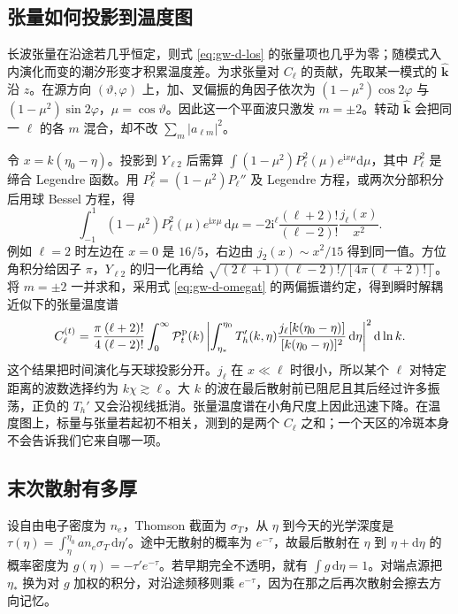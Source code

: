 \subsection{张量如何投影到温度图}

长波张量在沿途若几乎恒定，则式 \eqref{eq:gw-d-los} 的张量项也几乎为零；随模式入内演化而变的潮汐形变才积累温度差。为求张量对 $C_\ell$ 的贡献，先取某一模式的 $\hat{\bm k}$ 沿 $z$。在源方向 $(\vartheta,\varphi)$ 上，加、叉偏振的角因子依次为 $(1-\mu^2)\cos2\varphi$ 与 $(1-\mu^2)\sin2\varphi$，$\mu=\cos\vartheta$。因此这一个平面波只激发 $m=\pm2$。转动 $\hat{\bm k}$ 会把同一 $\ell$ 的各 $m$ 混合，却不改 $\sum_m|a_{\ell m}|^2$。

令 $x=k(\eta_0-\eta)$。投影到 $Y_{\ell 2}$ 后需算 $\int(1-\mu^2)P_\ell^2(\mu)e^{\mathrm i x\mu}\mathrm d\mu$，其中 $P_\ell^2$ 是缔合 Legendre 函数。用 $P_\ell^2=(1-\mu^2)P_\ell''$ 及 Legendre 方程，或两次分部积分后用球 Bessel 方程，得
\[
 \int_{-1}^1(1-\mu^2)P_\ell^2(\mu)e^{\mathrm i x\mu}\,\mathrm d\mu
 =-2\mathrm i^\ell\frac{(\ell+2)!}{(\ell-2)!}\frac{j_\ell(x)}{x^2}.
\]
例如 $\ell=2$ 时左边在 $x=0$ 是 $16/5$，右边由 $j_2(x)\sim x^2/15$ 得到同一值。方位角积分给因子 $\pi$，$Y_{\ell2}$ 的归一化再给 $\sqrt{(2\ell+1)(\ell-2)!/[4\pi(\ell+2)!]}$。将 $m=\pm2$ 一并求和，采用式 \eqref{eq:gw-d-omegat} 的两偏振谱约定，得到瞬时解耦近似下的张量温度谱
\begin{equation}\label{eq:gw-d-clt}
 C_\ell^{(t)}=\frac{\pi}{4}\frac{(\ell+2)!}{(\ell-2)!}
 \int_0^\infty \mathcal P_t^{\rm p}(k)
 \left|\int_{\eta_*}^{\eta_0}T_h'(k,\eta)
 \frac{j_\ell[k(\eta_0-\eta)]}{[k(\eta_0-\eta)]^2}\,\mathrm d\eta\right|^2\mathrm d\ln k .
\end{equation}
这个结果把时间演化与天球投影分开。$j_\ell$ 在 $x\ll\ell$ 时很小，所以某个 $\ell$ 对特定距离的波数选择约为 $k\chi\gtrsim\ell$。大 $k$ 的波在最后散射前已阻尼且其后经过许多振荡，正负的 $T_h'$ 又会沿视线抵消。张量温度谱在小角尺度上因此迅速下降。在温度图上，标量与张量若起初不相关，测到的是两个 $C_\ell$ 之和；一个天区的冷斑本身不会告诉我们它来自哪一项。

\subsection{末次散射有多厚}

设自由电子密度为 $n_e$，Thomson 截面为 $\sigma_T$，从 $\eta$ 到今天的光学深度是 $\tau(\eta)=\int_\eta^{\eta_0}a n_e\sigma_T\,\mathrm d\eta'$。途中无散射的概率为 $e^{-\tau}$，故最后散射在 $\eta$ 到 $\eta+\mathrm d\eta$ 的概率密度为 $g(\eta)=-\tau'e^{-\tau}$。若早期完全不透明，就有 $\int g\,\mathrm d\eta=1$。对端点源把 $\eta_*$ 换为对 $g$ 加权的积分，对沿途频移则乘 $e^{-\tau}$，因为在那之后再次散射会擦去方向记忆。

